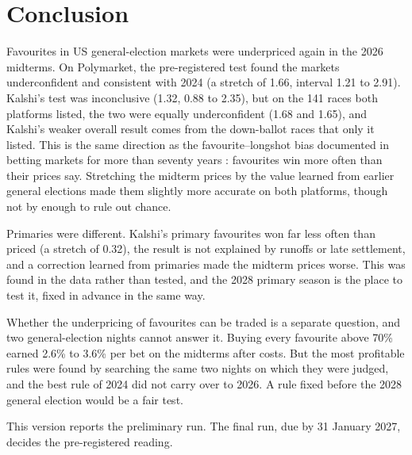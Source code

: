 \section{Conclusion}\label{sec:conclusion}

Favourites in US general-election markets were underpriced again in the 2026 midterms. On Polymarket, the
pre-registered test found the markets underconfident and consistent with 2024 (a stretch of 1.66, interval 1.21 to
2.91). Kalshi's test was inconclusive (1.32, 0.88 to 2.35), but on the 141 races both platforms listed, the two were
equally underconfident (1.68 and 1.65), and Kalshi's weaker overall result comes from the down-ballot races that only it
listed. This is the same direction as the favourite--longshot bias documented in betting markets for more than seventy
years \citep{griffith1949,thaler1988,snowberg2010}: favourites win more often than their prices say. Stretching the
midterm prices by the value learned from earlier general elections made them slightly more accurate on both platforms,
though not by enough to rule out chance.

Primaries were different. Kalshi's primary favourites won far less often than priced (a stretch of 0.32), the result is
not explained by runoffs or late settlement, and a correction learned from primaries made the midterm prices worse. This
was found in the data rather than tested, and the 2028 primary season is the place to test it, fixed in advance in the
same way.

Whether the underpricing of favourites can be traded is a separate question, and two general-election nights cannot
answer it. Buying every favourite above 70\% earned 2.6\% to 3.6\% per bet on the midterms after costs. But the most
profitable rules were found by searching the same two nights on which they were judged, and the best rule of 2024 did
not carry over to 2026. A rule fixed before the 2028 general election would be a fair test.

This version reports the preliminary run. The final run, due by 31 January 2027, decides the pre-registered reading.
